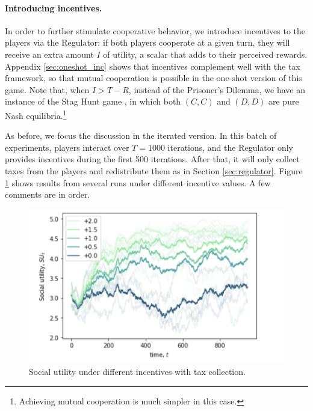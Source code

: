 



\paragraph{Introducing incentives.}\label{sec:incentives}


In order to further stimulate cooperative behavior, we introduce incentives to the players via the Regulator: if both players cooperate at a given turn, they will receive an extra amount $I$ of utility,
 a scalar that adds to their perceived rewards. Appendix  \ref{sec:oneshot_inc} shows that incentives complement well with the tax framework, so that mutual cooperation is possible in the one-shot version of this game. Note that, when $I>T-R$, instead of the Prisoner's Dilemma, we have an instance of the Stag Hunt game \cite{skyrms2004stag}, in which both $(C, C)$ and $(D, D)$ are 
 pure Nash equilibria.\footnote{Achieving mutual cooperation is much simpler in this case.}

As before, we focus the discussion in the iterated version.
In this batch of experiments, players interact over $T=1000$ iterations, and the Regulator only provides incentives during the first 500 iterations. After that, it will only collect taxes from the players and redistribute them as in Section \ref{sec:regulator}. Figure \ref{fig:inc1} shows
results from 
several runs under different incentive values. A few comments are in order.

\begin{figure}[!h]
\centering
\includegraphics[width=0.6\linewidth]{img/inc1.png}
\caption{Social utility under different incentives with tax collection.}\label{fig:inc1}
\end{figure}

